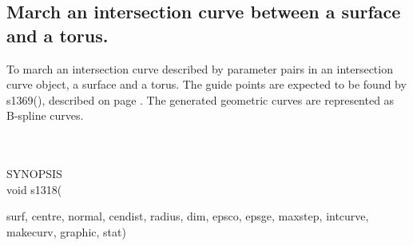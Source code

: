 \subsection{March an intersection curve between a surface and a torus.}
\begin{minipg1}
  To march an intersection curve described by parameter pairs in an intersection
  curve object, a surface and a torus.
  The guide points are expected to be found by s1369(), described on
  page \pageref{s1369}.
  The generated geometric curves are represented as B-spline curves.
\end{minipg1} \\ \\
SYNOPSIS\\
        \>void s1318(\begin{minipg3}
                        {\fov surf}, {\fov centre}, {\fov normal}, {\fov cendist}, {\fov radius}, {\fov dim}, {\fov epsco}, {\fov epsge},
                        {\fov maxstep}, {\fov intcurve}, {\fov makecurv}, {\fov graphic}, {\fov stat})
                \end{minipg3}\\[0.3ex]

